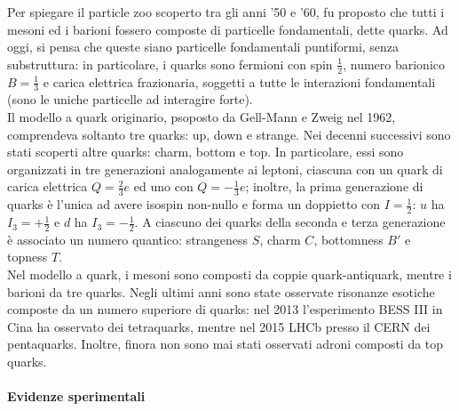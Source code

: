 Per spiegare il particle zoo scoperto tra gli anni '50 e '60, fu proposto che tutti i mesoni ed i barioni fossero composte di particelle fondamentali, dette quarks. Ad oggi, si pensa che queste siano particelle fondamentali puntiformi, senza substruttura: in particolare, i quarks sono fermioni con spin $ \frac{1}{2} $, numero barionico $ B = \frac{1}{3} $ e carica elettrica frazionaria, soggetti a tutte le interazioni fondamentali (sono le uniche particelle ad interagire forte).\\
Il modello a quark originario, psoposto da Gell-Mann e Zweig nel 1962, comprendeva soltanto tre quarks: up, down e strange. Nei decenni successivi sono stati scoperti altre quarks: charm, bottom e top. In particolare, essi sono organizzati in tre generazioni analogamente ai leptoni, ciascuna con un quark di carica elettrica $ Q = \frac{2}{3} e $ ed uno con $ Q = -\frac{1}{3} e $; inoltre, la prima generazione di quarks è l'unica ad avere isospin non-nullo e forma un doppietto con $ I = \frac{1}{2} $: $ u $ ha $ I_3 = +\frac{1}{2} $ e $ d $ ha $ I_3 = -\frac{1}{2} $. A ciascuno dei quarks della seconda e terza generazione è associato un numero quantico: strangeness $ S $, charm $ C $, bottomness $ B' $ e topness $ T $.\\
Nel modello a quark, i mesoni sono composti da coppie quark-antiquark, mentre i barioni da tre quarks. Negli ultimi anni sono state osservate risonanze esotiche composte da un numero superiore di quarks: nel 2013 l'esperimento BESS III in Cina ha osservato dei tetraquarks, mentre nel 2015 LHCb presso il CERN dei pentaquarks. Inoltre, finora non sono mai stati osservati adroni composti da top quarks.

\paragraph{Evidenze sperimentali}


